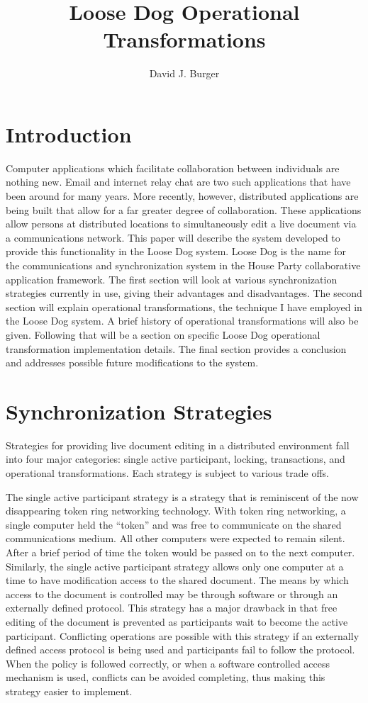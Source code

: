 \documentclass{article}
\author{David J. Burger}
\title{Loose Dog Operational Transformations}
\begin{document}
\maketitle

\section{Introduction}

Computer applications which facilitate collaboration between
individuals are nothing new.  Email and internet relay chat are two
such applications that have been around for many years.  More
recently, however, distributed applications are being built that allow
for a far greater degree of collaboration.  These applications allow
persons at distributed locations to simultaneously edit a live
document via a communications network.  This paper will describe
the system developed to provide this functionality in the Loose
Dog system.  Loose Dog is the name for the communications and
synchronization system in the House Party collaborative application
framework.  The first section will look at various
synchronization strategies currently in use, giving their advantages
and disadvantages.  The second section will explain operational
transformations, the technique I have employed in the Loose Dog system.
A brief history of operational transformations will also be given.
Following that will be a section on specific Loose Dog operational
transformation implementation details.  The final section provides a
conclusion and addresses possible future modifications to the system.

\section{Synchronization Strategies}

Strategies for providing live document editing in a distributed
environment fall into four major categories: single active
participant, locking, transactions, and operational transformations.
Each strategy is subject to various trade offs.

The single active participant strategy is a strategy that is
reminiscent of the now disappearing token ring networking technology.
With token ring networking, a single computer held the ``token'' and
was free to communicate on the shared communications medium.  All
other computers were expected to remain silent.  After a brief period
of time the token would be passed on to the next computer.  Similarly,
the single active participant strategy allows only one computer at a
time to have modification access to the shared document.  The means by
which access to the document is controlled may be through software or
through an externally defined protocol.  This strategy has a major
drawback in that free editing of the document is prevented as
participants wait to become the active participant.  Conflicting
operations are possible with this strategy if an externally defined
access protocol is being used and participants fail to follow the
protocol.  When the policy is followed correctly, or when a software
controlled access mechanism is used, conflicts can be avoided
completing, thus making this strategy easier to implement.
\end{document}
